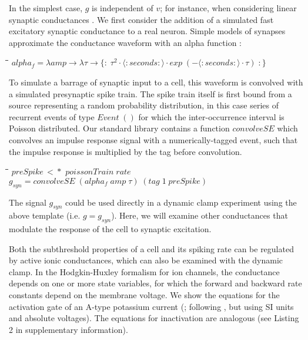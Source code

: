 \documentclass[11pt]{article}
\newlength{\lwidth}\setlength{\lwidth}{4.5cm}
\newlength{\cwidth}\setlength{\cwidth}{8mm} %
\newcommand{\Conid}[1]{\mathit{#1}}
\newcommand{\Varid}[1]{\mathit{#1}}
\begin{document}
In the simplest case, $g$ is independent of $v$; for instance, when
considering linear synaptic conductances \citep{Mitchell2003}. We
first consider the addition of a simulated fast excitatory synaptic
conductance to a real neuron. Simple models of synapses approximate
the conductance waveform with an alpha function
\citep{Carnevale2006}:
\begin{tabbing}
\qquad\=\hspace{\lwidth}\=\hspace{\cwidth}\=\+\kill
${alpha_f\mathrel{=}\lambda \Varid{amp}\to \lambda \tau\to \{\!:\!\;\tau^\mathrm{2}\!\cdot\!\langle:\Varid{seconds}:\rangle\!\cdot\!\Varid{exp}\;(\mathbin{-}\langle:\Varid{seconds}:\rangle\!\cdot\!\tau)\;\!:\!\}}$
\end{tabbing}
To simulate a barrage of synaptic input to a cell, this waveform is
convolved with a simulated presynaptic spike train. The spike train
itself is first bound from a source representing a random probability
distribution, in this case series of recurrent events of type \ensuremath{\Conid{Event}\;()} for which the inter-occurrence interval is Poisson distributed.
Our standard library contains a function \ensuremath{\Varid{convolveSE}} which
convolves an impulse response signal with a numerically-tagged event,
such that the impulse response is multiplied by the tag before
convolution.
\begin{tabbing}
\qquad\=\hspace{\lwidth}\=\hspace{\cwidth}\=\+\kill
${\Varid{preSpike}\,<\!\!\!*\,\,\Varid{poissonTrain}\;\Varid{rate}}$\\
${g_{syn}\mathrel{=}\Varid{convolveSE}\;(alpha_f\;\Varid{amp}\;\tau)\;(\Varid{tag}\;\mathrm{1}\;\Varid{preSpike})}$
\end{tabbing}The signal \ensuremath{g_{syn}} could be used directly in a dynamic clamp experiment
using the above template (i.e. \ensuremath{\Varid{g}\mathrel{=}g_{syn}}). Here, we will examine other conductances
that modulate the response of the cell to synaptic excitation.

Both the subthreshold properties of a cell and its spiking rate can be
regulated by active ionic conductances, which can also be examined
with the dynamic clamp. In the Hodgkin-Huxley formalism for ion
channels, the conductance depends on one or more state variables, for
which the forward and backward rate constants depend on the membrane
voltage. We show the equations for the activation gate of an A-type
potassium current (\citep{Connor1971}; following \citep{Traub1991},
but using SI units and absolute voltages). The equations for
inactivation are analogous (see Listing 2 in supplementary
information).
\end{document}
